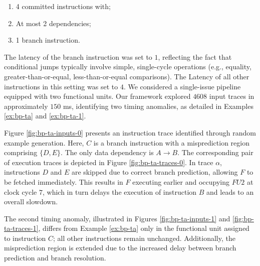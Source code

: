 \begin{enumerate}
    \item 4 committed instructions with;
    \item At most 2 dependencies;
    \item 1 branch instruction.
\end{enumerate}

The latency of the branch instruction was set to $1$, reflecting the fact that conditional jumps typically involve simple, single-cycle operations (e.g., equality, greater-than-or-equal, less-than-or-equal comparisons). The Latency of all other instructions in this setting was set to $4$. We considered a single-issue pipeline equipped with two functional units. Our framework explored $4608$ input traces in approximately $150$ ms, identifying two timing anomalies, as detailed in Examples \ref{ex:bp-ta} and \ref{ex:bp-ta-1}.

\begin{example}
Figure \ref{fig:bp-ta-inputs-0} presents an instruction trace identified through random example generation. Here, $C$ is a branch instruction with a misprediction region comprising $\{D, E\}$. The only data dependency is $A \rightarrow B$. The corresponding pair of execution traces is depicted in Figure \ref{fig:bp-ta-traces-0}. In trace $\alpha$, instructions $D$ and $E$ are skipped due to correct branch prediction, allowing $F$ to be fetched immediately. This results in $F$ executing earlier and occupying $FU2$ at clock cycle $7$, which in turn delays the execution of instruction $B$ and leads to an overall slowdown.

\label{ex:bp-ta}
\end{example}

\begin{example}
The second timing anomaly, illustrated in Figures \ref{fig:bp-ta-inputs-1} and \ref{fig:bp-ta-traces-1}, differs from Example \ref{ex:bp-ta} only in the functional unit assigned to instruction $C$; all other instructions remain unchanged. Additionally, the misprediction region is extended due to the increased delay between branch prediction and branch resolution.
\label{ex:bp-ta-1}
\end{example}


